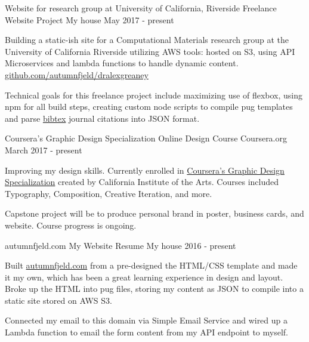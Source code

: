 \begin{cventries}
  \cventry
    {Website for research group at University of California, Riverside}
    {Freelance Website Project}
    {My house}
    {May 2017 - present}
    {
      \begin{cvitems}
        \item {Building a static-ish site for a Computational Materials research group at the University of California Riverside utilizing AWS tools: hosted on S3, using API Microservices and lambda functions to handle dynamic content. \href{https://github.com/autumnfjeld/dralexgreaney}{github.com/autumnfjeld/dralexgreaney}} 
        \item {Technical goals for this freelance project include maximizing use of flexbox, using npm for all build steps, creating custom node scripts to compile pug templates and parse \href{http://www.bibtex.org/About}{bibtex} journal citations into JSON format.}
      \end{cvitems}
    }
  \cventry
    {Coursera's Graphic Design Specialization}
    {Online Design Course}
    {Coursera.org}
    {March 2017 - present}
    {
      \begin{cvitems}
        \item {Improving my design skills. Currently enrolled in \href{https://www.coursera.org/specializations/graphic-design}{Coursera's Graphic Design Specialization} created by California Institute of the Arts. Courses included Typography, Composition, Creative Iteration, and more.} 
        \item {Capstone project will be to produce personal brand in poster, business cards, and website. Course progress is ongoing.}
      \end{cvitems}
    }
  \cventry
    {autumnfjeld.com}
    {My Website Resume}
    {My house}
    {2016 - present}
    {
      \begin{cvitems}
        \item { Built \href{http://autumnfjeld.com}{autumnfjeld.com} from a pre-designed the HTML/CSS template and made it my own, which has been a great learning experience in design and layout. Broke up the HTML into pug files, storing my content as JSON to compile into a static site stored on AWS S3.}    
        \item {Connected my email to this domain via Simple Email Service and wired up a Lambda function to email the form content from my API endpoint to myself.} 
      \end{cvitems}
    }    
\end{cventries}
